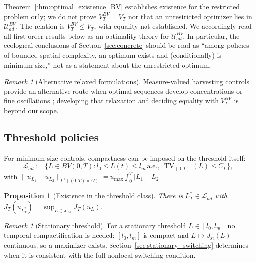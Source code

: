 \documentclass[pdflatex,sn-mathphys-num]{sn-jnl}
\newcommand{\Om}{\Omega}
\newcommand{\UadBV}{\mathcal{U}_{ad}^{BV}}
\DeclareMathOperator{\TV}{TV}
\theoremstyle{plain}
\newtheorem{proposition}[theorem]{Proposition}
\theoremstyle{definition}
\theoremstyle{remark}
\newtheorem{remark}[theorem]{Remark}
\begin{document}
Theorem~\ref{thm:optimal_existence_BV} establishes existence for the restricted
problem only; we do not prove $V_T^{BV}=V_T$ nor that an unrestricted optimizer
lies in $\UadBV$. The relation is
$\displaystyle V_T^{BV}\le V_T$,
with equality not established. We accordingly read all first-order results below
as an optimality theory for $\UadBV$. In particular, the ecological conclusions of
Section~\ref{sec:concrete} should be read as ``among policies of bounded spatial
complexity, an optimum exists and (conditionally) is minimum-size,'' not as a
statement about the unrestricted optimum.

\begin{remark}[Alternative relaxed formulations]
\label{rmk:relaxed_formulations}
Measure-valued harvesting controls provide an alternative route when optimal
sequences develop concentrations or fine oscillations
\cite{hritonenko2023existence,coclite2017time,wang2025multi}; developing that
relaxation and deciding equality with $V_T^{BV}$ is beyond our scope.
\end{remark}

\subsection{Threshold policies}
\label{subsec:threshold_compactification}

For minimum-size controls, compactness can be imposed on the threshold itself:
\[
\mathcal L_{ad}:=\big\{L\in BV(0,T):l_0\le L(t)\le l_m\ \text{a.e.},\
\TV_{(0,T)}(L)\le C_L\big\},
\]
with $\|u_{L_1}-u_{L_2}\|_{L^1((0,T)\times\Om)}=u_{\max}\int_0^T|L_1-L_2|$.

\begin{proposition}[Existence in the threshold class]
\label{prop:threshold_existence}
There is $L_T^*\in\mathcal L_{ad}$ with
$J_T(u_{L_T^*})=\sup_{L\in\mathcal L_{ad}}J_T(u_L)$.
\end{proposition}

\begin{remark}[Stationary threshold]
\label{rmk:stationary_threshold_existence}
For a stationary threshold $L\in[l_0,l_m]$ no temporal compactification is needed:
$[l_0,l_m]$ is compact and $L\mapsto J_{\mathrm{st}}(L)$ continuous, so a maximizer
exists. Section~\ref{sec:stationary_switching} determines when it is consistent
with the full nonlocal switching condition.
\end{remark}

\end{document}
